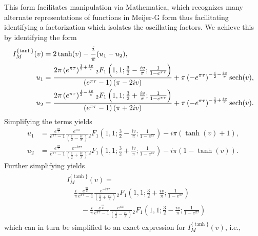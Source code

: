 This form facilitates manipulation via Mathematica, which recognizes many alternate
representations of functions in Meijer-G form thus facilitating identifying a factorization
which isolates the oscillating factors.  We achieve this by identifying the form
\begin{align}
\begin{split}
	I_M^{\{\tanh\}}(v) &= 2 \tanh(v) - \frac{i}{\pi}(u_1 - u_2), \\
    u_1 &= \frac{2\pi \left(e^{\pi\tau}\right)^{\frac{1}{2}+\frac{iv}{\pi}} {}_{2}F_{1}\left(1, 1; \frac{3}{2} - \frac{iv}{\pi}; \frac{1}{1-e^{\pi\tau}}\right)}{\left(e^{\pi\tau} - 1\right)(\pi - 2iv)} + \pi\left(-e^{\pi\tau}\right)^{-\frac{1}{2} - \frac{iv}{\pi}}\operatorname{sech}(v), \\
    u_2 &= \frac{2\pi \left(e^{\pi\tau}\right)^{\frac{1}{2}-\frac{iv}{\pi}} {}_{2}F_{1}\left(1, 1; \frac{3}{2} + \frac{iv}{\pi}; \frac{1}{1-e^{\pi\tau}}\right)}{\left(e^{\pi\tau} - 1\right)(\pi + 2iv)} + \pi\left(-e^{\pi\tau}\right)^{-\frac{1}{2} + \frac{iv}{\pi}}\operatorname{sech}(v).
\end{split}
\end{align}
Simplifying the terms yields
\begin{align}
	u_1 &=
	\frac{e^{\frac{\pi\tau}{2}}}{e^{\pi\tau} - 1}
	\frac{e^{i\pi\tau}}{\left(\frac{1}{2} - \frac{iv}{\pi}\right)}
	{}_{2}F_{1}\left(1, 1; \frac{3}{2} - \frac{iv}{\pi}; \frac{1}{1 - e^{\pi\tau}}\right)
	- i\pi (\tanh(v)+1), \\
	u_2 &=
	\frac{e^{\frac{\pi\tau}{2}}}{e^{\pi\tau} - 1}
	\frac{e^{-i\pi\tau}}{\left(\frac{1}{2} + \frac{iv}{\pi}\right)}
	{}_{2}F_{1}\left(1, 1; \frac{3}{2} + \frac{iv}{\pi}; \frac{1}{1 - e^{\pi\tau}}\right)
	- i\pi (1-\tanh(v)).
\end{align}
Further simplifying yields
\begin{align}
\begin{split}
	&I_M^{\{\tanh\}}(v) = \\
	&\quad \frac{i}{\pi}\frac{e^{\frac{\pi\tau}{2}}}{e^{\pi\tau} - 1}
	\frac{e^{-i\pi\tau}}{\left(\frac{1}{2} + \frac{iv}{\pi}\right)}
	{}_{2}F_{1}\left(1, 1; \frac{3}{2} + \frac{iv}{\pi}; \frac{1}{1 - e^{\pi\tau}}\right) \\
    &\quad\quad -
    \frac{i}{\pi}\frac{e^{\frac{\pi\tau}{2}}}{e^{\pi\tau} - 1}
	\frac{e^{i\pi\tau}}{\left(\frac{1}{2} - \frac{iv}{\pi}\right)}
	{}_{2}F_{1}\left(1, 1; \frac{3}{2} - \frac{iv}{\pi}; \frac{1}{1 - e^{\pi\tau}}\right)
\end{split}
\end{align}
which can in turn be simplified to an exact expression for $I_M^{\{\tanh\}}(v)$, i.e.,
